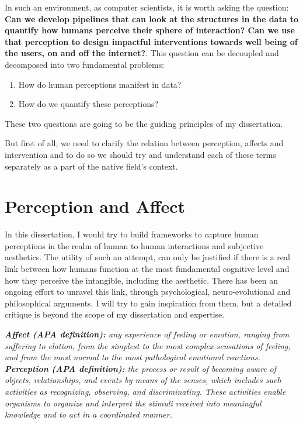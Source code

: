 In such an environment, as computer scientists, it is worth asking the question: \textbf{Can we develop pipelines that can look at the structures in the data to quantify how humans perceive their sphere of interaction? Can we use that perception to design impactful interventions towards well being of the users, on and off the internet?}. 
This question can be decoupled and decomposed into two fundamental problems:
\begin{enumerate}
\item How do human perceptions manifest in data? 
\item How do we quantify these perceptions?
\end{enumerate}
These two questions are going to be the guiding principles of my dissertation. 

But first of all, we need to clarify the relation between perception, affects and intervention and to do so we should try and understand each of these terms separately as a part of the native field's context.

\section{Perception and Affect}
In this dissertation, I would try to build frameworks to capture human perceptions in the realm of human to human interactions and subjective aesthetics. The utility of such an attempt, can only be justified if there is a real link between how humans function at the most fundamental cognitive level and how they perceive the intangible, including the aesthetic. There has been an ongoing effort to unravel this link, through psychological, neuro-evolutional and philosophical arguments. I will try to gain inspiration from them, but a detailed critique is beyond the scope of my dissertation and expertise.

\textsl{\textbf{Affect (APA definition):} any experience of feeling or emotion, ranging from suffering to elation, from the simplest to the most complex sensations of feeling, and from the most normal to the most pathological emotional reactions.}\\
\textsl{\textbf{Perception (APA definition):} the process or result of becoming aware of objects, relationships, and events by means of the senses, which includes such activities as recognizing, observing, and discriminating. These activities enable organisms to organize and interpret the stimuli received into meaningful knowledge and to act in a coordinated manner.}\\

